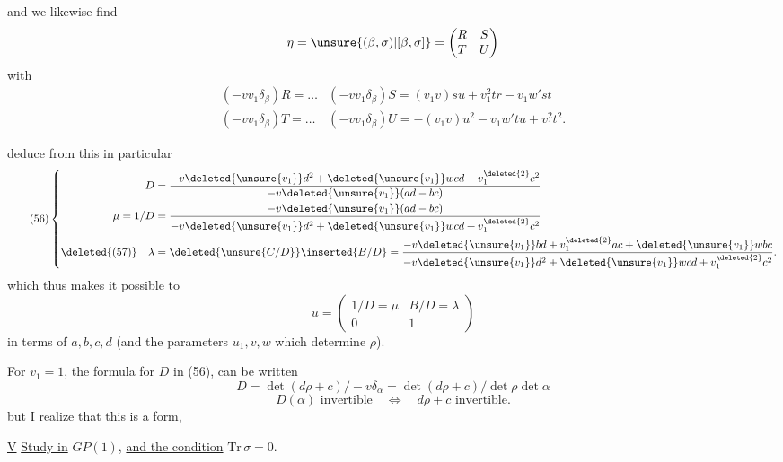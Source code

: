 
and we likewise find
\[
\eta=\unsure{(\beta,\sigma)|[\beta,\sigma]}=
\begin{pmatrix}R&S\\T&U\end{pmatrix}
\]
with
\[
\tag{55}
\begin{array}{ll}
(-vv_1\delta_\beta)R=\ldots
&(-vv_1\delta_\beta)S
 =(v_1v)su+v_1^{2}tr-v_1w'st\\
(-vv_1\delta_\beta)T=\ldots
&(-vv_1\delta_\beta)U
 =-(v_1v)u^2-v_1w'tu+v_1^{2}t^2.
\end{array}
\]

 deduce from this in particular
\[
\tag{56}
\left\{
\begin{aligned}
D&=\frac{-v\deleted{\unsure{v_1}}d^2+
\deleted{\unsure{v_1}}wcd+v_1^{\deleted{2}}c^2}
{-v\deleted{\unsure{v_1}}(ad-bc)}\\
\mu=1/D&=\frac{-v\deleted{\unsure{v_1}}(ad-bc)}
{-v\deleted{\unsure{v_1}}d^2+
\deleted{\unsure{v_1}}wcd+v_1^{\deleted{2}}c^2}\\
\deleted{(57)}\quad\lambda&=\deleted{\unsure{C/D}}\inserted{B/D}
=\frac{-v\deleted{\unsure{v_1}}bd+v_1^{\deleted{2}}ac+
\deleted{\unsure{v_1}}wbc}
{-v\deleted{\unsure{v_1}}d^2+
\deleted{\unsure{v_1}}wcd+v_1^{\deleted{2}}c^2}.
\end{aligned}
\right.
\]
which thus makes it possible to 
\[
\underline{u}=\begin{pmatrix}1/D=\mu&B/D=\lambda\\0&1\end{pmatrix}
\]
in terms of $a,b,c,d$ (and the parameters $u_1,v,w$
which determine $\rho$).

For \uline{$v_1=1$}, the formula for $D$ in (56), can be written
\[
\tag{57}
D=\det(d\rho+c)/-v\delta_\alpha
=\det(d\rho+c)/\det\rho\det\alpha
\]
\[
\tag{58}
D(\alpha)\text{ invertible}\quad\Longleftrightarrow\quad
d\rho+c\text{ invertible}.
\]
but I realize that this is a  form,


\uline{V}\qquad
\uline{Study}\uline{ in}
$GP(1)$, \uline{and the condition} $\mathrm{Tr}\,\sigma=0$.

